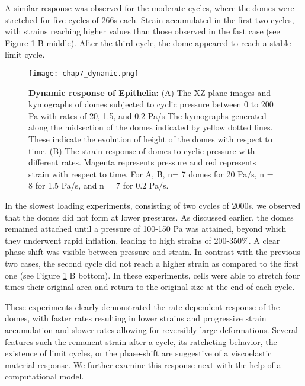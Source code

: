 A similar response was observed for the moderate cycles, where the domes were stretched for five cycles of 266s each. Strain accumulated in the first two cycles, with strains reaching higher values than those observed in the fast case (see Figure \ref{fig_7_6} B middle). After the third cycle, the dome appeared to reach a stable limit cycle.

\begin{figure}[h!]
	\centering
	\texttt{[image: chap7\_dynamic.png]}
	\caption{\label{fig_7_6} \textbf{Dynamic response of Epithelia:} (A) The XZ plane images and kymographs of domes subjected to cyclic pressure between 0 to 200 Pa with rates of 20, 1.5, and 0.2 Pa/s The kymographs generated along the midsection of the domes indicated by yellow dotted lines. These indicate the evolution of height of the domes with respect to time. (B) The strain response of domes to cyclic pressure with different rates. Magenta represents pressure and red represents strain with respect to time. For A, B, n= 7 domes for 20 Pa/s, n = 8 for 1.5 Pa/s, and n = 7 for 0.2 Pa/s. 
	}
\end{figure}

In the slowest loading experiments, consisting of two cycles of 2000s, we observed that the domes did not form at lower pressures. As discussed earlier, the domes remained attached until a pressure of 100-150 Pa was attained, beyond which they underwent rapid inflation, leading to high strains of 200-350\%. A clear phase-shift was visible between pressure and strain. In contrast with the previous two cases, the second cycle did not reach a higher strain as compared to the first one (see Figure \ref{fig_7_6} B bottom). In these experiments, cells were able to stretch four times their original area and return to the original size at the end of each cycle.

These experiments clearly demonstrated the rate-dependent response of the domes, with faster rates resulting in lower strains and progressive strain accumulation and slower rates allowing for reversibly large deformations. Several features such the remanent strain after a cycle, its ratcheting behavior, the existence of limit cycles, or the phase-shift are suggestive of a viscoelastic material response. We further examine this response next with the help of a computational model.



